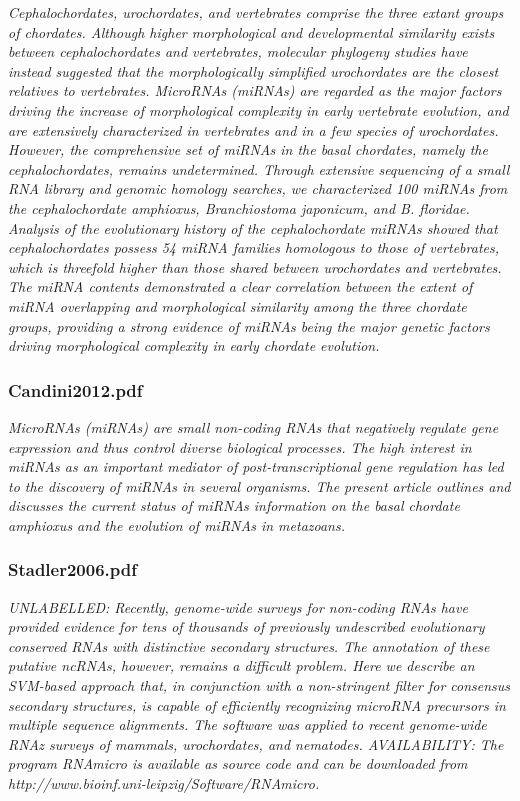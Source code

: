 \documentclass[graybox]{svmult}
\begin{document}
\cite{Dai2009}
\textit{Cephalochordates, urochordates, and vertebrates comprise the three extant groups of chordates. Although higher morphological and developmental similarity exists between cephalochordates and vertebrates, molecular phylogeny studies have instead suggested that the morphologically simplified urochordates are the closest relatives to vertebrates. MicroRNAs (miRNAs) are regarded as the major factors driving the increase of morphological complexity in early vertebrate evolution, and are extensively characterized in vertebrates and in a few species of urochordates. However, the comprehensive set of miRNAs in the basal chordates, namely the cephalochordates, remains undetermined. Through extensive sequencing of a small RNA library and genomic homology searches, we characterized 100 miRNAs from the cephalochordate amphioxus, Branchiostoma japonicum, and B. floridae. Analysis of the evolutionary history of the cephalochordate miRNAs showed that cephalochordates possess 54 miRNA families homologous to those of vertebrates, which is threefold higher than those shared between urochordates and vertebrates. The miRNA contents demonstrated a clear correlation between the extent of miRNA overlapping and morphological similarity among the three chordate groups, providing a strong evidence of miRNAs being the major genetic factors driving morphological complexity in early chordate evolution.}
\subsubsection{Candini2012.pdf}
\cite{Candiani2012}
\textit{MicroRNAs (miRNAs) are small non-coding RNAs that negatively regulate gene expression and thus control diverse biological processes. The high interest in miRNAs as an important mediator of post-transcriptional gene regulation has led to the discovery of miRNAs in several organisms. The present article outlines and discusses the current status of miRNAs information on the basal chordate amphioxus and the evolution of miRNAs in metazoans.}

\subsubsection{Stadler2006.pdf}
\cite{Hertel2006}
\textit{UNLABELLED: Recently, genome-wide surveys for non-coding RNAs have provided evidence for tens of thousands of previously undescribed evolutionary conserved RNAs with distinctive secondary structures. The annotation of these putative ncRNAs, however, remains a difficult problem. Here we describe an SVM-based approach that, in conjunction with a non-stringent filter for consensus secondary structures, is capable of efficiently recognizing microRNA precursors in multiple sequence alignments. The software was applied to recent genome-wide RNAz surveys of mammals, urochordates, and nematodes. AVAILABILITY: The program RNAmicro is available as source code and can be downloaded from http://www.bioinf.uni-leipzig/Software/RNAmicro.}
\end{document}
